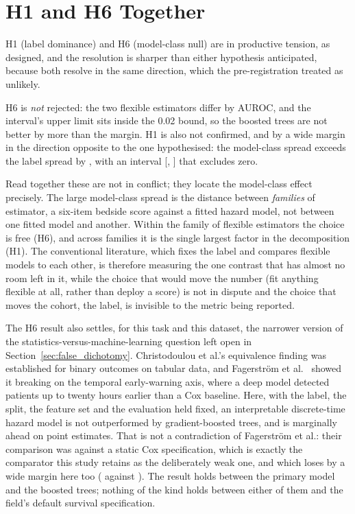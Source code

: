 \section{H1 and H6 Together}
\label{sec:discussion_h1h6}

H1 (label dominance) and H6 (model-class null) are in productive tension, as
designed, and the resolution is sharper than either hypothesis anticipated,
because both resolve in the same direction, which the pre-registration treated
as unlikely.

H6 is \emph{not} rejected: the two flexible estimators differ by \pcHSixEst{}
AUROC, and the interval's upper limit sits inside the 0.02 bound, so the
boosted trees are not better by more than the margin. H1 is also not
confirmed, and by a wide margin in the direction opposite to the one
hypothesised: the model-class spread \pcSpreadModelClass{} exceeds the label
spread \pcSpreadLabel{} by \pcHOneEst, with an interval
[\pcHOneCiLo, \pcHOneCiHi] that excludes zero.

Read together these are not in conflict; they locate the model-class effect
precisely. The large model-class spread is the distance between \emph{families}
of estimator, a six-item bedside score against a fitted hazard model, not
between one fitted model and another. Within the family of flexible estimators
the choice is free (H6), and across families it is the single largest factor in
the decomposition (H1). The conventional literature, which fixes the label and
compares flexible models to each other, is therefore measuring the one contrast
that has almost no room left in it, while the choice that would move the number (fit anything flexible at all, rather than deploy a score) is not in
dispute and the choice that moves the cohort, the label, is invisible to
the metric being reported.

The H6 result also settles, for this task and this dataset, the narrower
version of the statistics-versus-machine-learning question left open in
Section~\ref{sec:false_dichotomy}. Christodoulou et al.'s
\cite{christodoulou2019cox} equivalence finding was established for binary
outcomes on tabular data, and Fagerstr{\"o}m et al.\ \cite{fagerstrom2019lisep}
showed it breaking on the temporal early-warning axis, where a deep model
detected patients up to twenty hours earlier than a Cox baseline. Here, with
the label, the split, the feature set and the evaluation held fixed, an
interpretable discrete-time hazard model is not outperformed by
gradient-boosted trees, and is marginally ahead on point estimates. That is not
a contradiction of Fagerstr{\"o}m et al.: their comparison was against a static
Cox specification, which is exactly the comparator this study retains as the
deliberately weak one, and which loses by a wide margin here too
(\pcAurocCoxB{} against \pcAurocPrimaryB). The result holds between the primary
model and the boosted trees; nothing of the kind holds between either of them
and the field's default survival specification.

